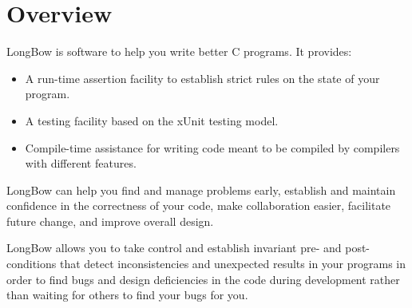 

\flushbottom %

\maketitle %

\begin{multicols}{2}
\tableofcontents
\end{multicols}


\thispagestyle{empty} %


\section{Overview} %

LongBow is software to help you write better C programs. It provides: 
\begin{itemize}
\item A run-time assertion facility to establish strict rules on the state of your program.
\item A testing facility based on the xUnit testing model.
\item Compile-time assistance for writing code meant to be compiled by compilers with different features. 
\end{itemize}

LongBow can help you find and manage problems early, establish and maintain confidence in the correctness of your code, make collaboration easier, facilitate future change, and improve overall design.

LongBow allows you to take control and establish invariant pre- and post-conditions that detect inconsistencies and unexpected results in your programs in order to find bugs and design deficiencies in the code during development rather than waiting for others to find your bugs for you.

